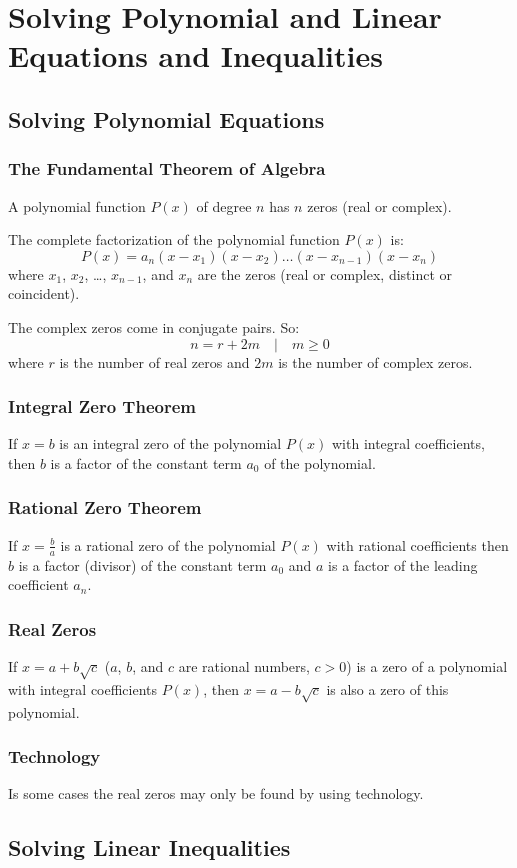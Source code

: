 \chapter{Solving Polynomial and Linear Equations and Inequalities}
	\section{Solving Polynomial Equations}
		\subsection{The Fundamental Theorem of Algebra}
			A polynomial function $P(x)$ of degree $n$ has $n$ zeros (real or complex).

			The complete factorization of the polynomial function $P(x)$ is:
			\[P(x)=a_n(x-x_1)(x-x_2)\dots(x-x_{n-1})(x-x_n)\]
			where $x_1$, $x_2$, \dots, $x_{n-1}$, and $x_n$ are the zeros (real or complex, distinct or coincident).

			The complex zeros come in conjugate pairs. So:
			\[n=r+2m \quad | \quad m \geq 0\]
			where $r$ is the number of real zeros and $2m$ is the number of complex zeros.
		\subsection{Integral Zero Theorem}
			If $x=b$ is an integral zero of the polynomial $P(x)$ with integral coefficients, then $b$ is a factor of the constant term $a_0$ of the polynomial.
		\subsection{Rational Zero Theorem}
			If $x=\frac{b}{a}$ is a rational zero of the polynomial $P(x)$ with rational coefficients then $b$ is a factor (divisor) of the constant term $a_0$ and $a$ is a factor of the leading coefficient $a_n$.
		\subsection{Real Zeros}
			If $x=a+b\sqrt{c}$ ($a$, $b$, and $c$ are rational numbers, $c>0$) is a zero of a polynomial with integral coefficients $P(x)$, then $x=a-b\sqrt{c}$ is also a zero of this polynomial.
		\subsection{Technology}
			Is some cases the real zeros may only be found by using technology.
	\section{Solving Linear Inequalities}
